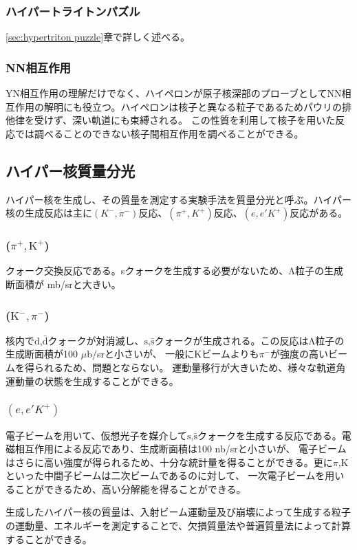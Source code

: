 \documentclass[a4paper,11pt,uplatex]{jsbook}
\begin{document}
\subsubsection{ハイパートライトンパズル}
\ref{sec:hypertriton puzzle}章で詳しく述べる。
\subsubsection{NN相互作用}

YN相互作用の理解だけでなく、ハイペロンが原子核深部のプローブとしてNN相互作用の解明にも役立つ。ハイペロンは核子と異なる粒子であるためパウリの排他律を受けず、深い軌道にも束縛される。
この性質を利用して核子を用いた反応では調べることのできない核子間相互作用を調べることができる。
\subsection{ハイパー核質量分光}
ハイパー核を生成し、その質量を測定する実験手法を質量分光と呼ぶ。ハイパー核の生成反応は主に$(K^-, \pi^-)$反応、$(\pi^+, K^+)$反応、$(e,e'K^+)$反応がある。
\subsubsection{($\pi^+, \text{K}^+$)}
クォーク交換反応である。sクォークを生成する必要がないため、Λ粒子の生成断面積が mb/srと大きい。
\subsubsection{($\text{K}^-, \pi^-$)}
核内で$\text{d}$,$\bar{\text{d}}$クォークが対消滅し、$\text{s}$,$\bar{\text{s}}$クォークが生成される。この反応はΛ粒子の生成断面積が100 $\mu$b/srと小さいが、
一般にKビームよりも$\pi^-$が強度の高いビームを得られるため、問題とならない。
運動量移行が大きいため、様々な軌道角運動量の状態を生成することができる。
\subsubsection{$(e,e'K^+)$}
電子ビームを用いて、仮想光子を媒介して$\text{s}$,$\bar{\text{s}}$クォークを生成する反応である。電磁相互作用による反応であり、生成断面積は100 nb/srと小さいが、
電子ビームはさらに高い強度が得られるため、十分な統計量を得ることができる。更に$\pi$,Kといった中間子ビームは二次ビームであるのに対して、
一次電子ビームを用いることができるため、高い分解能を得ることができる。

生成したハイパー核の質量は、入射ビーム運動量及び崩壊によって生成する粒子の運動量、エネルギーを測定することで、欠損質量法や普遍質量法によって計算することができる。
\end{document}
